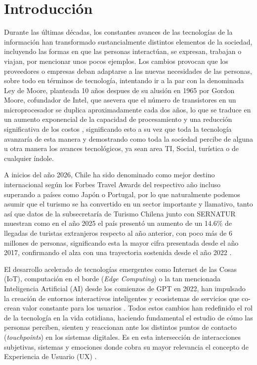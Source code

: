 \chapter{Introducción}
\label{cha:introduccion}

Durante las últimas décadas, los constantes avances de las tecnologías de la información han transformado sustancialmente distintos elementos de la sociedad, incluyendo las formas en que las personas interactúan, se expresan, trabajan o viajan, por mencionar unos pocos ejemplos. Los cambios provocan que los proveedores o empresas deban adaptarse a las nuevas necesidades de las personas, sobre todo en términos de tecnología, intentando ir a la par con la denominada Ley de Moore, planteada 10 años despues de su alusión en 1965 por Gordon Moore, cofundador de Intel, que asevera que el número de transistores en un microprocesador se duplica aproximadamente cada dos años, lo que se traduce en un aumento exponencial de la capacidad de procesamiento y una reducción significativa de los costos \textcite{intel_moore_2025}, significando esto a su vez que toda la tecnología avanzaría de esta manera y demostrando como toda la sociedad percibe de alguna u otra manera los avances tecnológicos, ya sean area TI, Social, turística o de cualquier índole.

A inicios del año 2026, Chile ha sido denominado como mejor destino internacional según los Forbes Travel Awards del respectivo año \textcite{sernatur_forbes_2026} incluso superando a países como Japón o Portugal, por lo que naturalmente podemos asumir que el turismo se ha convertido en un sector importante y llamativo, tanto así que datos de la subsecretaría de Turismo Chilena junto con SERNATUR muestran como en el año 2025 el país presentó un aumento de un 14.6\% de llegadas de turistas extranjeros respecto al año anterior, con poco más de 6 millones de personas, significando esta la mayor cifra presentada desde el año 2017, confirmando el alza con una trayectoria sostenida desde el año 2022 \textcite{subturismo_turistas_2026}. 

El desarrollo acelerado de tecnologías emergentes como Internet de las Cosas (IoT), computación en el borde (\textit{Edge Computing}) o la tan mencionada Inteligencia Artificial (AI) desde los comienzos de GPT en 2022, han impulsado la creación de entornos interactivos inteligentes y ecosistemas de servicios que co-crean valor constante para los usuarios \parencite{rusu2023holistic}. Todos estos cambios han redefinido el rol de la tecnología en la vida cotidiana, haciendo fundamental el estudio de cómo las personas perciben, sienten y reaccionan ante los distintos puntos de contacto (\textit{touchpoints}) en los sistemas digitales. Es en esta intersección de interacciones subjetivas, sistemas y emociones donde cobra su mayor relevancia el concepto de Experiencia de Usuario (UX) \parencite{ortiz2024slr}.

